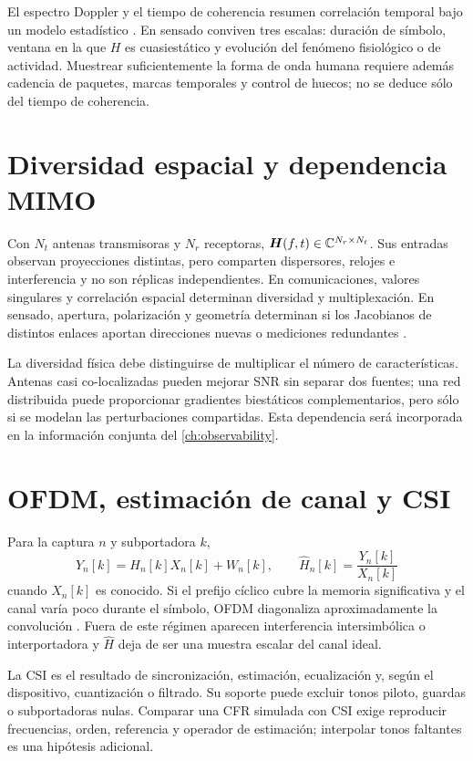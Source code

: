 El espectro Doppler y el tiempo de coherencia resumen correlación temporal bajo
un modelo estadístico \citep{Bello1963,Molisch2022}. En sensado conviven tres
escalas: duración de símbolo, ventana en la que $H$ es cuasiestático y evolución
del fenómeno fisiológico o de actividad. Muestrear suficientemente la forma de
onda humana requiere además cadencia de paquetes, marcas temporales y control de
huecos; no se deduce sólo del tiempo de coherencia.

\section{Diversidad espacial y dependencia MIMO}

Con $N_t$ antenas transmisoras y $N_r$ receptoras,
$\bm{H}(f,t)\in\mathbb{C}^{N_r\times N_t}$. Sus entradas observan proyecciones distintas,
pero comparten dispersores, relojes e interferencia y no son réplicas
independientes. En comunicaciones, valores singulares y correlación espacial
determinan diversidad y multiplexación. En sensado, apertura, polarización y
geometría determinan si los Jacobianos de distintos enlaces aportan direcciones
nuevas o mediciones redundantes \citep{TseViswanath2005,Molisch2022}.

La diversidad física debe distinguirse de multiplicar el número de características.
Antenas casi co-localizadas pueden mejorar SNR sin separar dos fuentes; una red
distribuida puede proporcionar gradientes biestáticos complementarios, pero sólo
si se modelan las perturbaciones compartidas. Esta dependencia será incorporada
en la información conjunta del \cref{ch:observability}.

\section{OFDM, estimación de canal y CSI}

Para la captura $n$ y subportadora $k$,
\begin{equation}
Y_n[k]=H_n[k]X_n[k]+W_n[k],\qquad
\widehat H_n[k]=\frac{Y_n[k]}{X_n[k]}
\end{equation}
cuando $X_n[k]$ es conocido. Si el prefijo cíclico cubre la memoria significativa
y el canal varía poco durante el símbolo, \ac{OFDM} diagonaliza aproximadamente
la convolución \citep{ProakisSalehi2008}. Fuera de este régimen aparecen
interferencia intersimbólica o interportadora y $\widehat H$ deja de ser una
muestra escalar del canal ideal.

La \ac{CSI} es el resultado de sincronización, estimación, ecualización y, según
el dispositivo, cuantización o filtrado. Su soporte puede excluir tonos piloto,
guardas o subportadoras nulas. Comparar una CFR simulada con CSI exige reproducir
frecuencias, orden, referencia y operador de estimación; interpolar tonos faltantes
es una hipótesis adicional.


